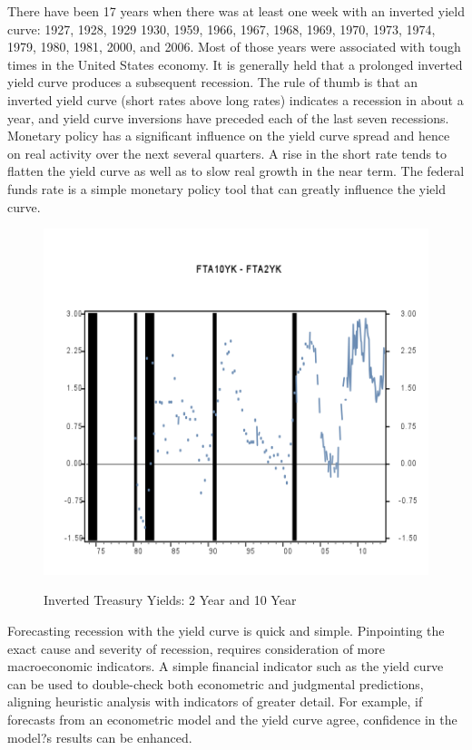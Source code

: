 There have been 17 years when there was at least one week with an inverted yield curve: 1927, 1928, 1929 1930, 1959, 1966, 1967, 1968, 1969, 1970, 1973, 1974, 1979, 1980, 1981, 2000, and 2006.\cite{Shaw}  Most of those years were associated with tough times in the United States economy. It is generally held that a prolonged inverted yield curve produces a subsequent recession.\cite{Shaw}  The rule of thumb is that an inverted yield curve (short rates above long rates) indicates a recession in about a year, and yield curve inversions have preceded each of the last seven recessions.\cite{Haubrich}  Monetary policy has a significant influence on the yield curve spread and hence on real activity over the next several quarters.\cite{Estrella2} A rise in the short rate tends to flatten the yield curve as well as to slow real growth in the near term.  The federal funds rate is a simple monetary policy tool that can greatly influence the yield curve.

\begin{figure}[H]
\centering
\includegraphics[scale=.70]{figure/InvertedTbill.png}\\[-0.7cm]
\caption{Inverted Treasury Yields: 2 Year and 10 Year\label{fig:inverted}}
\end{figure}

Forecasting recession with the yield curve is quick and simple.  Pinpointing the exact cause and severity of recession, requires consideration of more macroeconomic indicators.  A simple financial indicator such as the yield curve can be used to double-check both econometric and judgmental predictions, aligning heuristic analysis with indicators of greater detail.  For example, if forecasts from an econometric model and the yield curve agree, confidence in the model?s results can be enhanced.\cite{Estrella2}

